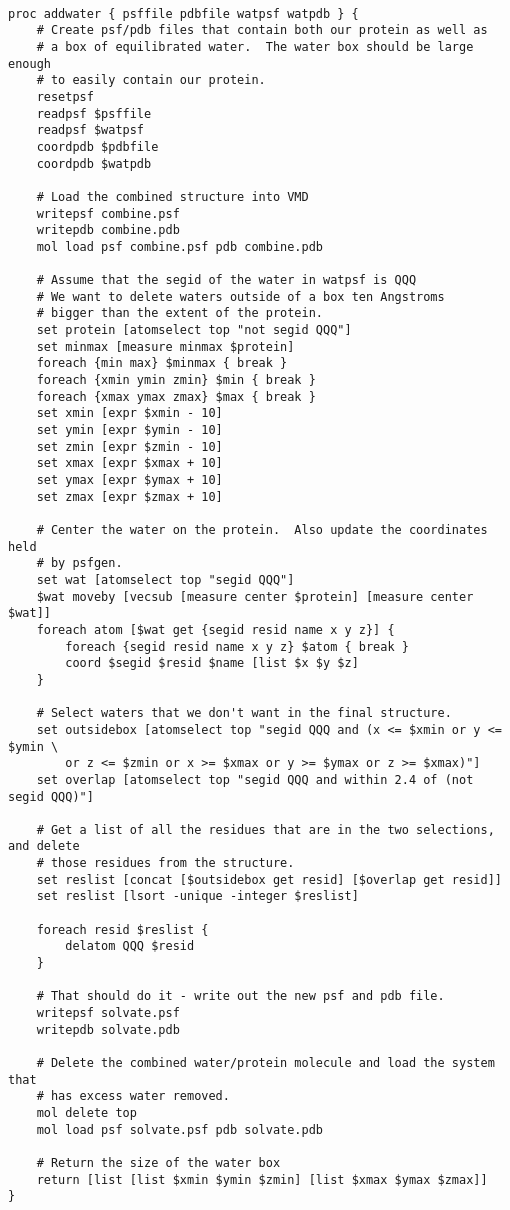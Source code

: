 \begin{verbatim}

proc addwater { psffile pdbfile watpsf watpdb } {
	# Create psf/pdb files that contain both our protein as well as
	# a box of equilibrated water.  The water box should be large enough
	# to easily contain our protein.
	resetpsf
	readpsf $psffile
	readpsf $watpsf
	coordpdb $pdbfile
	coordpdb $watpdb

	# Load the combined structure into VMD   
	writepsf combine.psf
	writepdb combine.pdb
	mol load psf combine.psf pdb combine.pdb

	# Assume that the segid of the water in watpsf is QQQ
	# We want to delete waters outside of a box ten Angstroms
	# bigger than the extent of the protein. 
	set protein [atomselect top "not segid QQQ"]
	set minmax [measure minmax $protein]
	foreach {min max} $minmax { break }
	foreach {xmin ymin zmin} $min { break }
	foreach {xmax ymax zmax} $max { break }
    set xmin [expr $xmin - 10]
    set ymin [expr $ymin - 10]
    set zmin [expr $zmin - 10]
    set xmax [expr $xmax + 10]
    set ymax [expr $ymax + 10]
    set zmax [expr $zmax + 10]

	# Center the water on the protein.  Also update the coordinates held
	# by psfgen.
	set wat [atomselect top "segid QQQ"]
	$wat moveby [vecsub [measure center $protein] [measure center $wat]]
	foreach atom [$wat get {segid resid name x y z}] {
		foreach {segid resid name x y z} $atom { break }
		coord $segid $resid $name [list $x $y $z]
	}

	# Select waters that we don't want in the final structure.
	set outsidebox [atomselect top "segid QQQ and (x <= $xmin or y <= $ymin \
		or z <= $zmin or x >= $xmax or y >= $ymax or z >= $xmax)"]
	set overlap [atomselect top "segid QQQ and within 2.4 of (not segid QQQ)"]

	# Get a list of all the residues that are in the two selections, and delete
	# those residues from the structure.
	set reslist [concat [$outsidebox get resid] [$overlap get resid]]
	set reslist [lsort -unique -integer $reslist]

	foreach resid $reslist {
		delatom QQQ $resid
	}

	# That should do it - write out the new psf and pdb file. 
	writepsf solvate.psf 
	writepdb solvate.pdb

	# Delete the combined water/protein molecule and load the system that
	# has excess water removed.
	mol delete top
	mol load psf solvate.psf pdb solvate.pdb

	# Return the size of the water box
	return [list [list $xmin $ymin $zmin] [list $xmax $ymax $zmax]]
}

\end{verbatim}

